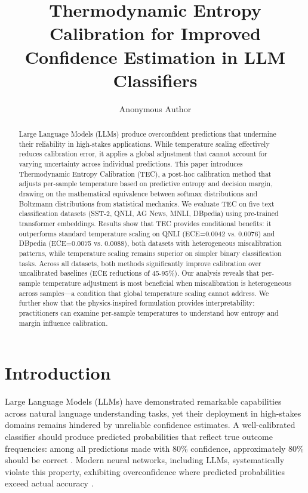 \documentclass[11pt,letterpaper]{article}
\title{Thermodynamic Entropy Calibration for Improved Confidence Estimation in LLM Classifiers}
\author{Anonymous Author}
\date{}
\begin{document}
\maketitle

\begin{abstract}
Large Language Models (LLMs) produce overconfident predictions that undermine their reliability in high-stakes applications.
While temperature scaling effectively reduces calibration error, it applies a global adjustment that cannot account for
varying uncertainty across individual predictions. This paper introduces Thermodynamic Entropy Calibration (TEC), a post-hoc
calibration method that adjusts per-sample temperature based on predictive entropy and decision margin, drawing on the mathematical
equivalence between softmax distributions and Boltzmann distributions from statistical mechanics. We evaluate TEC on five
text classification datasets (SST-2, QNLI, AG News, MNLI, DBpedia) using pre-trained transformer embeddings. Results show
that TEC provides conditional benefits: it outperforms standard temperature scaling on QNLI (ECE=0.0042 vs. 0.0076) and
DBpedia (ECE=0.0075 vs. 0.0088), both datasets with heterogeneous miscalibration patterns, while temperature scaling remains
superior on simpler binary classification tasks. Across all datasets, both methods significantly improve calibration over
uncalibrated baselines (ECE reductions of 45-95\%). Our analysis reveals that per-sample temperature adjustment is most beneficial
when miscalibration is heterogeneous across samples---a condition that global temperature scaling cannot address. We further
show that the physics-inspired formulation provides interpretability: practitioners can examine per-sample temperatures
to understand how entropy and margin influence calibration.
\end{abstract}

\section{Introduction}

Large Language Models (LLMs) have demonstrated remarkable capabilities across natural language understanding tasks, yet their deployment in high-stakes domains remains hindered by unreliable confidence estimates. A well-calibrated classifier should produce predicted probabilities that reflect true outcome frequencies: among all predictions made with 80\% confidence, approximately 80\% should be correct \cite{Guo2017}. Modern neural networks, including LLMs, systematically violate this property, exhibiting overconfidence where predicted probabilities exceed actual accuracy \cite{Guo2017}.
\end{document}
